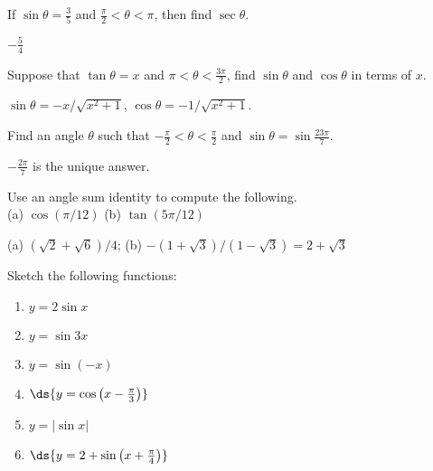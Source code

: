 \begin{enumialphparenastyle}
\begin{multicols}{2}
\begin{ex}
If $\sin\theta=\frac{3}{5}$ and $\frac{\pi}{2}<\theta<\pi$, then find $\sec\theta$.
\begin{sol}
$-\frac{5}{4}$
\end{sol}
\end{ex}

\begin{ex}
Suppose that $\tan\theta=x$ and $\pi<\theta<\frac{3\pi}{2}$, find $\sin\theta$ and $\cos\theta$ in terms of $x$.
\begin{sol}
$\sin\theta=-x/\sqrt{x^{2}+1}$, $\cos\theta=-1/\sqrt{x^{2}+1}$.
\end{sol}
\end{ex}

\begin{ex}
Find an angle $\theta$ such that $-\frac{\pi}{2}<\theta<\frac{\pi}{2}$ and $\sin\theta=\sin\frac{23\pi}{7}$.
\begin{sol}
$-\frac{2\pi}{7}$ is the unique answer.
\end{sol}
\end{ex}


\begin{ex} 
Use an angle sum identity to compute the following. \\

\vspace{-2mm} \hspace{4mm}  (a) \hspace{1mm} $\cos(\pi/12)$ \hspace{1cm} (b) \hspace{1mm} $\tan(5\pi/12)$
\begin{sol} 
(a) $(\sqrt{2}+\sqrt{6})/4$; \hspace{1cm} (b) $-(1+\sqrt3)/(1-\sqrt3)=2+\sqrt3$
\end{sol}
\end{ex}


\begin{ex} Sketch the following functions:
	\begin{multicols}{2}
		\begin{enumerate}
			\item	$y=2\sin x$
			\item	$y=\sin 3x$
			\item	$y=\sin(-x)$
			\item   $\ds{y=\cos \left(x-\frac{\pi}{3} \right)}$
			\item   $y=|\sin x|$ 
			\item   $\ds{y=2+\sin \left(x+\frac{\pi}{4} \right)}$
		\end{enumerate}
	\end{multicols}
\end{ex}


\end{multicols}
\end{enumialphparenastyle}
